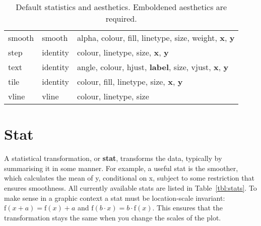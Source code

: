 \begin{table}
\begin{center}
\begin{tabular}{llp{3in}}
  smooth     & smooth    & alpha, colour, fill, linetype, size, weight, \textbf{x}, \textbf{y}                                                      \\
  step       & identity  & colour, linetype, size, \textbf{x}, \textbf{y}                                                                           \\
  text       & identity  & angle, colour, hjust, \textbf{label}, size, vjust, \textbf{x}, \textbf{y}                                               \\
  tile       & identity  & colour, fill, linetype, size, \textbf{x}, \textbf{y}                                                                     \\
  vline      & vline     & colour, linetype, size                                                                                                     \\
  
  \bottomrule
  \end{tabular}
  \end{center}
  \caption{Default statistics and aesthetics.  Emboldened aesthetics are required.}
  \label{tbl:geom-aesthetics}
\end{table}


\section{Stat}
\label{sec:stat}

A statistical transformation, or {\bf stat}, transforms the data, typically by summarising it in some manner.  For example, a useful stat is the smoother, which calculates the mean of y, conditional on x, subject to some restriction that ensures smoothness. All currently available stats are listed in Table~\ref{tbl:stats}.  To make sense in a graphic context a stat must be location-scale invariant: $\mbox{f}(x + a) = \mbox{f}(x) + a$ and $\mbox{f}(b \cdot x) = b \cdot \mbox{f}(x)$.  This ensures that the transformation stays the same when you change the scales of the plot.

